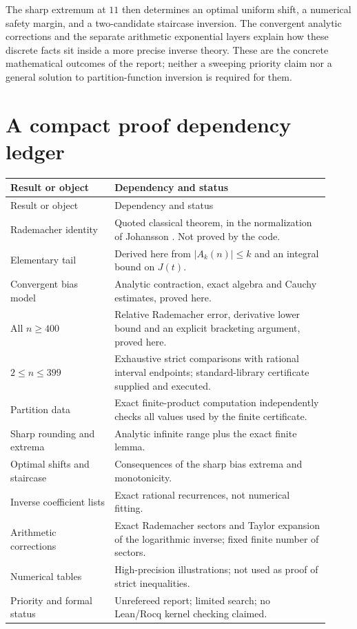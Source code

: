 \documentclass[11pt]{article}
\numberwithin{equation}{section}
\theoremstyle{definition}
\theoremstyle{remark}
\begin{document}
The sharp extremum at $11$ then determines an optimal uniform shift,
a numerical safety margin, and a two-candidate staircase inversion.
The convergent analytic corrections and the separate arithmetic
exponential layers explain how these discrete facts sit inside a more
precise inverse theory. These are the concrete mathematical outcomes
of the report; neither a sweeping priority claim nor a general solution
to partition-function inversion is required for them.

\appendix
\section{A compact proof dependency ledger}\label{app:ledger}
\begin{center}
\begin{longtable}{@{}p{0.30\linewidth}p{0.62\linewidth}@{}}
\toprule
Result or object & Dependency and status\\
\midrule
\endfirsthead
\toprule
Result or object & Dependency and status\\
\midrule
\endhead
Rademacher identity & Quoted classical theorem, in the normalization of
Johansson \cite{johansson}. Not proved by the code.\\
Elementary tail & Derived here from $|A_k(n)|\le k$ and an integral
bound on $J(t)$.\\
Convergent bias model & Analytic contraction, exact algebra and Cauchy
estimates, proved here.\\
All $n\ge400$ & Relative Rademacher error, derivative lower bound and
an explicit bracketing argument, proved here.\\
$2\le n\le399$ & Exhaustive strict comparisons with rational interval
endpoints; standard-library certificate supplied and executed.\\
Partition data & Exact finite-product computation independently checks
all values used by the finite certificate.\\
Sharp rounding and extrema & Analytic infinite range plus the exact
finite lemma.\\
Optimal shifts and staircase & Consequences of the sharp bias extrema
and monotonicity.\\
Inverse coefficient lists & Exact rational recurrences, not numerical
fitting.\\
Arithmetic corrections & Exact Rademacher sectors and Taylor expansion
of the logarithmic inverse; fixed finite number of sectors.\\
Numerical tables & High-precision illustrations; not used as proof of
strict inequalities.\\
Priority and formal status & Unrefereed report; limited search; no
Lean/Rocq kernel checking claimed.\\
\bottomrule
\end{longtable}
\end{center}
\end{document}
